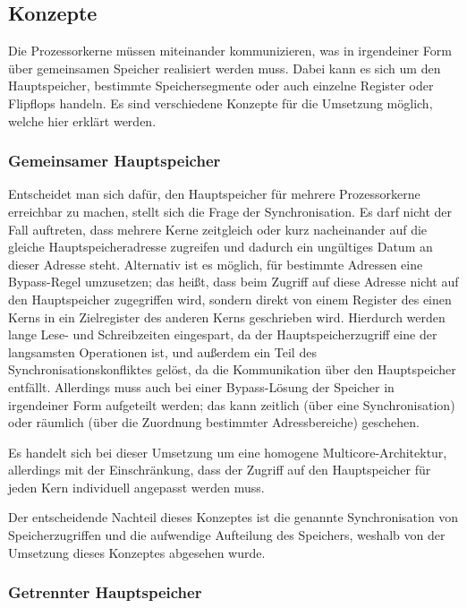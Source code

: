\documentclass[11pt,a4paper,titlepage]{article}
\begin{document}
\subsection{Konzepte}

Die Prozessorkerne müssen miteinander kommunizieren, was in irgendeiner Form über gemeinsamen Speicher realisiert werden muss. Dabei kann es sich um den Hauptspeicher, bestimmte Speichersegmente oder auch einzelne Register oder Flipflops handeln. Es sind verschiedene Konzepte für die Umsetzung möglich, welche hier erklärt werden.

\subsubsection{Gemeinsamer Hauptspeicher}

Entscheidet man sich dafür, den Hauptspeicher für mehrere Prozessorkerne erreichbar zu machen, stellt sich die Frage der Synchronisation. Es darf nicht der Fall auftreten, dass mehrere Kerne zeitgleich oder kurz nacheinander auf die gleiche Hauptspeicheradresse zugreifen und dadurch ein ungültiges Datum an dieser Adresse steht. Alternativ ist es möglich, für bestimmte Adressen eine Bypass-Regel umzusetzen; das heißt, dass beim Zugriff auf diese Adresse nicht auf den Hauptspeicher zugegriffen wird, sondern direkt von einem Register des einen Kerns in ein Zielregister des anderen Kerns geschrieben wird. Hierdurch werden lange Lese- und Schreibzeiten eingespart, da der Hauptspeicherzugriff eine der langsamsten Operationen ist, und außerdem ein Teil des Synchronisationskonfliktes gelöst, da die Kommunikation über den Hauptspeicher entfällt. Allerdings muss auch bei einer Bypass-Lösung der Speicher in irgendeiner Form aufgeteilt werden; das kann zeitlich (über eine Synchronisation) oder räumlich (über die Zuordnung bestimmter Adressbereiche) geschehen.

Es handelt sich bei dieser Umsetzung um eine homogene Multicore-Architektur, allerdings mit der Einschränkung, dass der Zugriff auf den Hauptspeicher für jeden Kern individuell angepasst werden muss. 

Der entscheidende Nachteil dieses Konzeptes ist die genannte Synchronisation von Speicherzugriffen und die aufwendige Aufteilung des Speichers, weshalb von der Umsetzung dieses Konzeptes abgesehen wurde. 

\subsubsection{Getrennter Hauptspeicher}
\end{document}
